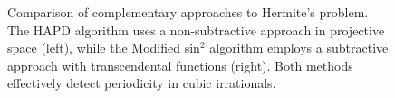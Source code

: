 \begin{figure}[ht]
\caption{Comparison of complementary approaches to Hermite's problem. The HAPD algorithm uses a non-subtractive approach in projective space (left), while the Modified sin$^2$ algorithm employs a subtractive approach with transcendental functions (right). Both methods effectively detect periodicity in cubic irrationals.}
\label{fig:complementary_approaches}
\end{figure} 